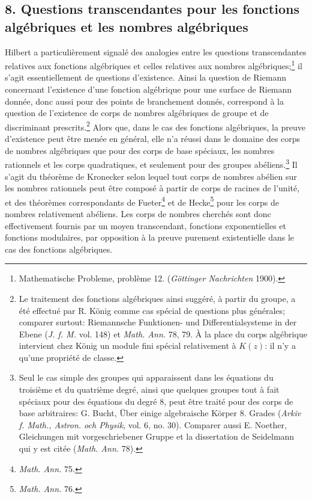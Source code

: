 \subsection*{8. Questions transcendantes pour les fonctions algébriques et les nombres algébriques}

Hilbert a particulièrement signalé des analogies entre les questions transcendantes relatives aux fonctions algébriques et celles relatives aux nombres algébriques;\footnote{Mathematische Probleme, problème 12. (\emph{Göttinger Nachrichten} 1900).} il s'agit essentiellement de questions d'existence. Ainsi la question de Riemann concernant l'existence d'une fonction algébrique pour une surface de Riemann donnée, donc aussi pour des points de branchement donnés, correspond à la question de l'existence de corps de nombres algébriques de groupe et de discriminant prescrits.\footnote{Le traitement des fonctions algébriques ainsi suggéré, à partir du groupe, a été effectué par R. König comme cas spécial de questions plus générales; comparer surtout: Riemannsche Funktionen- und Differentialsysteme in der Ebene (\emph{J. f. M.} vol. 148) et \emph{Math. Ann.} 78, 79. À la place du corps algébrique intervient chez König un module fini spécial relativement à \(K(z)\): il n'y a qu'une \og{}propriété de classe\fg{}.} Alors que, dans le cas des fonctions algébriques, la preuve d'existence peut être menée en général, elle n'a réussi dans le domaine des corps de nombres algébriques que pour des corps de base spéciaux, les nombres rationnels et les corps quadratiques, et seulement pour des groupes abéliens.\footnote{Seul le cas simple des groupes qui apparaissent dans les équations du troisième et du quatrième degré, ainsi que quelques groupes tout à fait spéciaux pour des équations du degré 8, peut être traité pour des corps de base arbitraires: G. Bucht, Über einige algebraische Körper 8. Grades (\emph{Arkiv f. Math., Astron. och Physik}, vol. 6, no. 30). Comparer aussi E. Noether, Gleichungen mit vorgeschriebener Gruppe et la dissertation de Seidelmann qui y est citée (\emph{Math. Ann.} 78).} Il s'agit du théorème de Kronecker selon lequel tout corps de nombres abélien sur les nombres rationnels peut être composé à partir de corps de racines de l'unité, et des théorèmes correspondants de Fueter\footnote{\emph{Math. Ann.} 75.} et de Hecke\footnote{\emph{Math. Ann.} 76.} pour les corps de nombres relativement abéliens. Les corps de nombres cherchés sont donc effectivement fournis par un moyen transcendant, fonctions exponentielles et fonctions modulaires, par opposition à la preuve purement existentielle dans le cas des fonctions algébriques.

